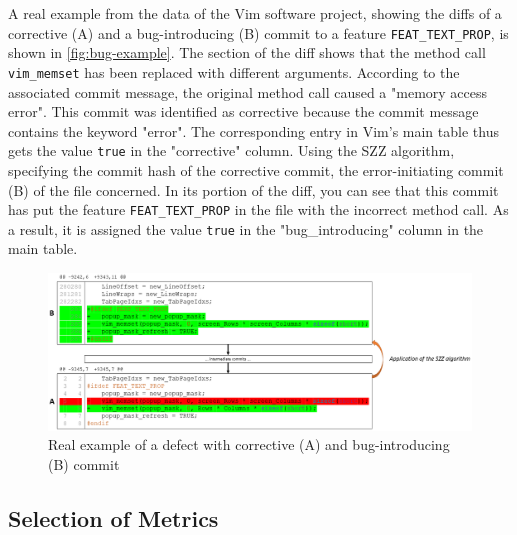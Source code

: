 A real example from the data of the Vim software project, showing the diffs of a corrective (A) and a bug-introducing (B) commit to a feature \texttt{FEAT\_TEXT\_PROP}, is shown in \autoref{fig:bug-example}. The section of the diff shows that the method call \texttt{vim\_memset} has been replaced with different arguments. According to the associated commit message, the original method call caused a "memory access error". This commit was identified as corrective because the commit message contains the keyword "error". The corresponding entry in Vim's main table thus gets the value \texttt{true} in the "corrective" column. Using the SZZ algorithm, specifying the commit hash of the corrective commit, the error-initiating commit (B) of the file concerned. In its portion of the diff, you can see that this commit has put the feature \texttt{FEAT\_TEXT\_PROP} in the file with the incorrect method call. As a result, it is assigned the value \texttt{true} in the "bug\_introducing" column in the main table.

\begin{figure}[ht]
    \centering
    \includegraphics[width=\textwidth]{Bug_example_real}
    \caption{Real example of a defect with corrective (A) and bug-introducing (B) commit\label{fig:bug-example}}
\end{figure}


\subsection{Selection of Metrics}

